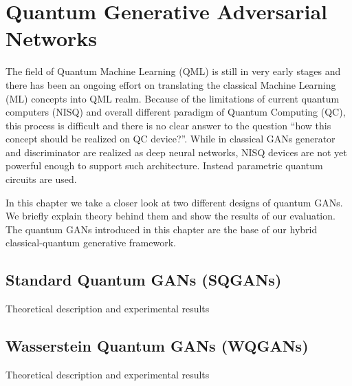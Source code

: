 \chapter{Quantum Generative Adversarial Networks}\label{chapter:quantum_gans}
The field of Quantum Machine Learning (QML) is still in very early stages and there
has been an ongoing effort on translating the  classical Machine Learning (ML)
concepts into QML realm. Because of the limitations of current quantum computers
(NISQ) \cite{bharti2021noisy} and overall different paradigm of Quantum
Computing (QC), this process is difficult and there is no clear
answer to the question ``how this concept should be realized on QC device?''.
While in classical GANs generator and discriminator are realized as deep neural
networks, NISQ devices are not yet powerful enough to support such architecture.
Instead parametric quantum circuits \cite{Schuld_2020} are used.

In this chapter we take a closer look at two different designs of quantum GANs.
We briefly explain theory behind them and show the results of our evaluation.
The quantum GANs introduced in this chapter are the base of our hybrid
classical-quantum generative framework.

\section{Standard Quantum GANs (SQGANs)}
Theoretical description and experimental results
\section{Wasserstein Quantum GANs (WQGANs)}
Theoretical description and experimental results

